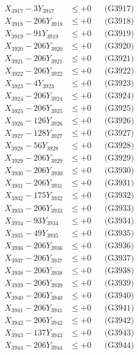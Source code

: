 \documentclass[a4paper,10pt]{article}
\begin{document}
{\begin{align}
X_{3917} - 3Y_{3917} &\leq +0 && \text{(G3917)} \\
X_{3918} - 206Y_{3918} &\leq +0 && \text{(G3918)} \\
X_{3919} - 91Y_{3919} &\leq +0 && \text{(G3919)} \\
X_{3920} - 206Y_{3920} &\leq +0 && \text{(G3920)} \\
\allowbreak
X_{3921} - 206Y_{3921} &\leq +0 && \text{(G3921)} \\
X_{3922} - 206Y_{3922} &\leq +0 && \text{(G3922)} \\
X_{3923} - 4Y_{3923} &\leq +0 && \text{(G3923)} \\
X_{3924} - 206Y_{3924} &\leq +0 && \text{(G3924)} \\
X_{3925} - 206Y_{3925} &\leq +0 && \text{(G3925)} \\
X_{3926} - 126Y_{3926} &\leq +0 && \text{(G3926)} \\
X_{3927} - 128Y_{3927} &\leq +0 && \text{(G3927)} \\
X_{3928} - 56Y_{3928} &\leq +0 && \text{(G3928)} \\
X_{3929} - 206Y_{3929} &\leq +0 && \text{(G3929)} \\
X_{3930} - 206Y_{3930} &\leq +0 && \text{(G3930)} \\
\allowbreak
X_{3931} - 206Y_{3931} &\leq +0 && \text{(G3931)} \\
X_{3932} - 175Y_{3932} &\leq +0 && \text{(G3932)} \\
X_{3933} - 206Y_{3933} &\leq +0 && \text{(G3933)} \\
X_{3934} - 93Y_{3934} &\leq +0 && \text{(G3934)} \\
X_{3935} - 49Y_{3935} &\leq +0 && \text{(G3935)} \\
X_{3936} - 206Y_{3936} &\leq +0 && \text{(G3936)} \\
X_{3937} - 206Y_{3937} &\leq +0 && \text{(G3937)} \\
X_{3938} - 206Y_{3938} &\leq +0 && \text{(G3938)} \\
X_{3939} - 206Y_{3939} &\leq +0 && \text{(G3939)} \\
X_{3940} - 206Y_{3940} &\leq +0 && \text{(G3940)} \\
\allowbreak
X_{3941} - 206Y_{3941} &\leq +0 && \text{(G3941)} \\
X_{3942} - 206Y_{3942} &\leq +0 && \text{(G3942)} \\
X_{3943} - 137Y_{3943} &\leq +0 && \text{(G3943)} \\
X_{3944} - 206Y_{3944} &\leq +0 && \text{(G3944)} \\

\end{align}}
\end{document}
